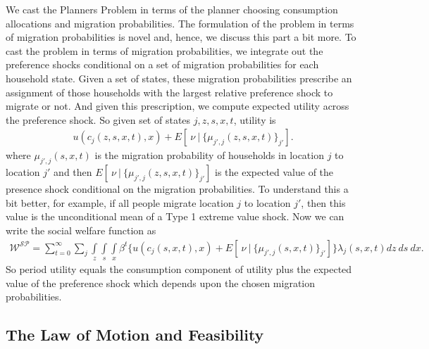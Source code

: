 \documentclass[12pt,pdftex]{article}
\begin{document}
\begin{onehalfspacing}

We cast the Planners Problem in terms of the planner choosing consumption allocations and migration probabilities. The formulation of the problem in terms of migration probabilities is novel and, hence, we discuss this part a bit more. To cast the problem in terms of migration probabilities, we integrate out the preference shocks conditional on a set of migration probabilities for each household state. Given a set of states, these migration probabilities prescribe an assignment of those households with the largest relative preference shock to migrate or not. And given this prescription, we compute expected utility across the preference shock. So given set of states $j, z, s, x, t$, utility is
\begin{align}
u(c_{j}(z,s, x, t), x) + E[ \ \nu \ | \ \big\{\mu_{j',j}(z,s,x,t)\big\}_{j'} ].
\label{eq:utility-shocks}
\end{align}
where $\mu_{j',j}(s,x,t)$ is the migration probability of households in location $j$ to location $j'$ and then $E[ \ \nu \ | \ \big\{\mu_{j',j}(z,s,x,t)\big\}_{j'} ]$ is the expected value of the presence shock conditional on the migration probabilities. To understand this a bit better, for example, if all people migrate location $j$ to location $j'$, then this value is the unconditional mean of a Type 1 extreme value shock. Now we can write the social welfare function as
\begin{align}
\mathcal{W^{SP}} = \sum_{t=0}^{\infty}\sum_{j} \int\limits_{z} \int\limits_{s} \int\limits_{x} \beta^{t} \bigg \{ u(c_{j}(s, x, t), x) + E[ \ \nu \ | \ \big\{\mu_{j',j}(s,x,t)\big\}_{j'}] \bigg \} \lambda_{j}(s, x, t) dz \ ds \ dx.
\label{eq:sp-social_welfare2}
\end{align}
So period utility equals the consumption component of utility plus the expected value of the preference shock which depends upon the chosen migration probabilities.

\subsection{The Law of Motion and Feasibility}


\end{onehalfspacing}
\end{document}
